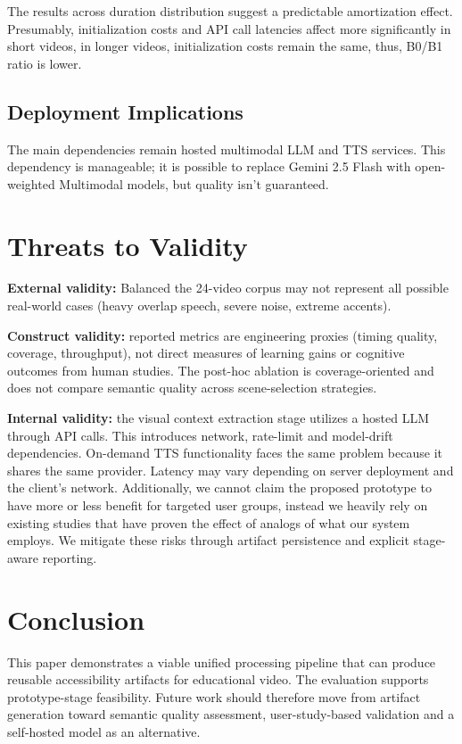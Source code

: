 ﻿\documentclass[conference]{IEEEtran}
\begin{document}
The results across duration distribution suggest a predictable amortization effect. Presumably, initialization costs and API call latencies affect more significantly in short videos, in longer videos, initialization costs remain the same, thus, B0/B1 ratio is lower.

\subsection{Deployment Implications}


The main dependencies remain hosted multimodal LLM and TTS services. This dependency is manageable; it is possible to replace Gemini 2.5 Flash with open-weighted Multimodal models, but quality isn't guaranteed.

\section{Threats to Validity}
\textbf{External validity:} Balanced the 24-video corpus may not represent all possible real-world cases (heavy overlap speech, severe noise, extreme accents).

\textbf{Construct validity:} reported metrics are engineering proxies (timing quality, coverage, throughput), not direct measures of learning gains or cognitive outcomes from human studies. The post-hoc ablation is coverage-oriented and does not compare semantic quality across scene-selection strategies.

\textbf{Internal validity:} the visual context extraction stage utilizes a hosted LLM through API calls. This introduces network, rate-limit and model-drift dependencies. On-demand TTS functionality faces the same problem because it shares the same provider. Latency may vary depending on server deployment and the client's network. Additionally, we cannot claim the proposed prototype to have more or less benefit for targeted user groups, instead we heavily rely on existing studies that have proven the effect of analogs of what our system employs. We mitigate these risks through artifact persistence and explicit stage-aware reporting.

\section{Conclusion}
This paper demonstrates a viable unified processing pipeline that can produce reusable accessibility artifacts for educational video. The evaluation supports prototype-stage feasibility. Future work should therefore move from artifact generation toward semantic quality assessment, user-study-based validation and a self-hosted model as an alternative.



\end{document}
